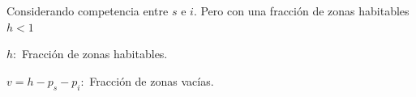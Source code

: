 \documentclass[twocolumn,aps,prl]{revtex4-1}
\begin{document}







Considerando competencia entre $s$ e $i$. Pero con una fracción de zonas habitables $h<1$ 

$h:$ Fracción de zonas habitables.

$v=h-p_{s}-p_{i}:$ Fracción de zonas vacías.

\end{document}
